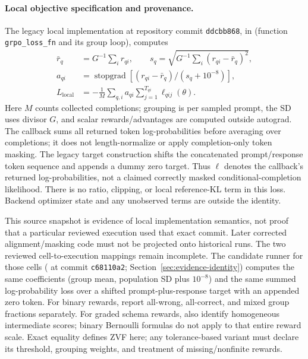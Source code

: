 \paragraph{Local objective specification and provenance.}
The legacy local implementation at repository commit \texttt{ddcbb868}, in
(function \texttt{grpo\_loss\_fn} and its group loop), computes
\begin{align}
\bar r_q&=G^{-1}\sum_i r_{qi},\qquad
s_q=\sqrt{G^{-1}\sum_i(r_{qi}-\bar r_q)^2},\\
a_{qi}&=\operatorname{stopgrad}\left[(r_{qi}-\bar r_q)/(s_q+10^{-8})\right],\\
L_{\mathrm{local}}&=-\frac{1}{M}\sum_{q,i}a_{qi}
 \sum_{j=1}^{T_{qi}}\ell_{qij}(\theta).
\end{align}
Here $M$ counts collected completions; grouping is per sampled prompt, the SD
uses divisor $G$, and scalar rewards/advantages are computed outside autograd.
The callback sums all returned token log-probabilities before averaging over
completions; it does not length-normalize or apply completion-only token masking.
The legacy target construction shifts the concatenated prompt/response token
sequence and appends a dummy zero target. Thus $\ell$ denotes the callback's
returned log-probabilities, not a claimed correctly masked conditional-completion
likelihood. There is no ratio, clipping, or local reference-KL term in this loss.
Backend optimizer state and any unobserved terms are outside the identity.

This source snapshot is evidence of local implementation semantics, not proof
that a particular reviewed execution used that exact commit. Later corrected
alignment/masking code must not be projected onto historical runs. The two
reviewed cell-to-execution mappings remain incomplete. The candidate runner for
those cells ( at
commit \texttt{c68110a2}; Section~\ref{sec:evidence-identity}) computes the same
coefficients (group mean, population SD plus $10^{-8}$) and the same summed
log-probability loss over a shifted prompt-plus-response target with an
appended zero token.
For binary rewards, report all-wrong, all-correct, and mixed group fractions
separately. For graded schema rewards, also identify homogeneous intermediate
scores; binary Bernoulli formulas do not apply to that entire reward scale.
Exact equality defines ZVF here; any tolerance-based variant must declare its
threshold, grouping weights, and treatment of missing/nonfinite rewards.
